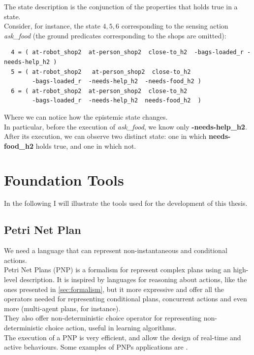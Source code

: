 \documentclass[pdftex,12pt,a4paper]{report}
\begin{document}
\noindent The state description is the conjunction of the properties that holds true in a state.\\ 
Consider, for instance, the state $4,5,6$ corresponding to the sensing action \textit{ask\_food} (the ground predicates corresponding to the shops are omitted): 
\begin{verbatim}
  4 = ( at-robot_shop2  at-person_shop2  close-to_h2  -bags-loaded_r -needs-help_h2 )
  5 = ( at-robot_shop2   at-person_shop2  close-to_h2  
        -bags-loaded_r  -needs-help_h2  -needs-food_h2 )
  6 = ( at-robot_shop2  at-person_shop2  close-to_h2  
        -bags-loaded_r  -needs-help_h2  needs-food_h2  )
\end{verbatim}
Where we can notice how the epistemic state changes.\\ 
In particular, before the execution of  \textit{ask\_food}, we know only \textbf{-needs-help\_h2}. After its execution, we can observe two distinct state: one in which \textbf{needs-food\_h2} holds true, and one in which not.

\chapter{Foundation Tools}
In the following I will illustrate the tools used for the development of this thesis.

\section{Petri Net Plan}\label{petrinet}
We need a language that can represent non-instantaneous and conditional actions. \\
Petri Net Plans (PNP)\cite{ziparo2006petri}%
\cite{ziparo2008pnp}%
is a formalism for represent complex plans using an high-level description.
It is inspired by languages for reasoning about actions, like the ones presented in \ref{sec:formalism}, but it more expressive and offer all the operators needed for representing conditional plans, concurrent actions and even more (multi-agent plans, for instance).\\
They also offer non-deterministic choice operator for representing non-deterministic choice action, useful in learning algorithms. \\
The execution of a PNP is very efficient, and allow the design of real-time and active behaviours.
Some examples of PNPs applications are \cite{bastianelli2013line}\cite{palamara2008robotic}\cite{farinelli2006assignment}.
\end{document}
